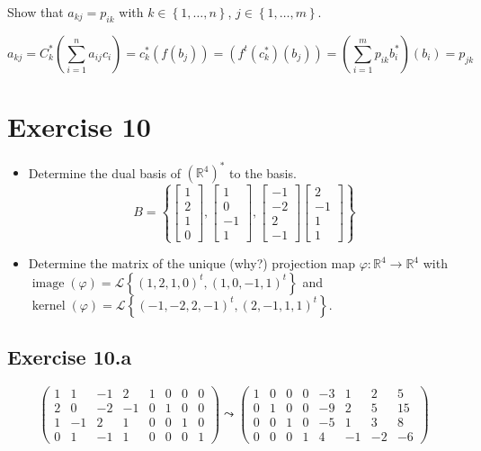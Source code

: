 \documentclass[a4paper]{article}
\theoremstyle{definition}
\DeclareMathOperator\kernel{kernel}
\DeclareMathOperator\image{image}
\newcommand\set[1]{\left\{#1\right\}}
\begin{document}
Show that $a_{kj} = p_{ik}$ with $k \in \set{1, \ldots, n}$, $j \in \set{1, \ldots, m}$.

\[ a_{kj} = C_k^*\left(\sum_{i=1}^n a_{ij} c_i\right) = c_k^*\left(f(b_j)\right) = \left(f^t(c_k^*)(b_j)\right)
  = \left(\sum_{i=1}^m p_{ik} b_i^*\right)(b_i) = p_{jk} \]

\section{Exercise 10}
\begin{ex}
  \begin{itemize}
    \item Determine the dual basis of $(\mathbb R^4)^*$ to the basis.
      \[
        B = \left\{
          \begin{bmatrix} 1 \\ 2 \\ 1 \\ 0 \end{bmatrix},
          \begin{bmatrix} 1 \\ 0 \\ -1 \\ 1 \end{bmatrix},
          \begin{bmatrix} -1 \\ -2 \\ 2 \\ -1 \end{bmatrix}
          \begin{bmatrix} 2 \\ -1 \\ 1 \\ 1 \end{bmatrix}
        \right\}
      \]
    \item
      Determine the matrix of the unique (why?) projection map
      $\varphi: \mathbb R^4 \to \mathbb R^4$ with $\image(\varphi) = \mathcal L\set{(1,2,1,0)^t, (1,0,-1,1)^t}$
      and $\kernel(\varphi) = \mathcal L\set{(-1, -2, 2, -1)^t, (2, -1, 1, 1)^t}$.
  \end{itemize}
\end{ex}

\subsection{Exercise 10.a}

\[
  \begin{pmatrix}
    1 & 1 & -1 & 2  & 1 & 0 & 0 & 0 \\
    2 & 0 & -2 & -1 & 0 & 1 & 0 & 0 \\
    1 & -1 & 2 & 1  & 0 & 0 & 1 & 0 \\
    0 & 1 & -1 & 1  & 0 & 0 & 0 & 1
  \end{pmatrix}
  \leadsto
  \begin{pmatrix}
    1 & 0 & 0 & 0 & -3 & 1 & 2 & 5 \\
    0 & 1 & 0 & 0 & -9 & 2 & 5 & 15 \\
    0 & 0 & 1 & 0 & -5 & 1 & 3 & 8 \\
    0 & 0 & 0 & 1 & 4 & -1 & -2 & -6
  \end{pmatrix}
\]
\end{document}
